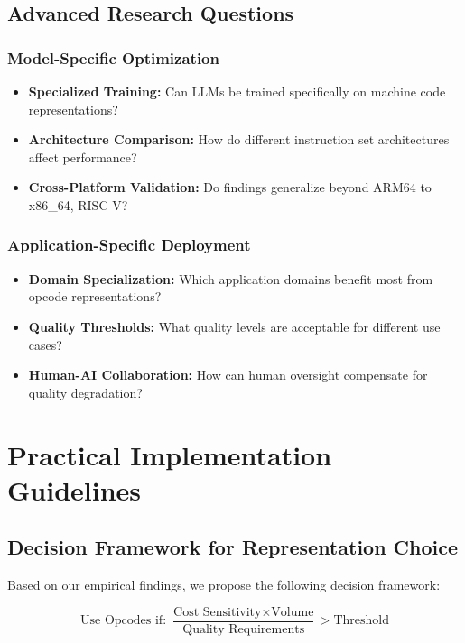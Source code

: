 \documentclass[11pt,a4paper]{article}
\begin{document}
\subsection{Advanced Research Questions}

\subsubsection{Model-Specific Optimization}
\begin{itemize}
    \item \textbf{Specialized Training:} Can LLMs be trained specifically on machine code representations?
    \item \textbf{Architecture Comparison:} How do different instruction set architectures affect performance?
    \item \textbf{Cross-Platform Validation:} Do findings generalize beyond ARM64 to x86\_64, RISC-V?
\end{itemize}

\subsubsection{Application-Specific Deployment}
\begin{itemize}
    \item \textbf{Domain Specialization:} Which application domains benefit most from opcode representations?
    \item \textbf{Quality Thresholds:} What quality levels are acceptable for different use cases?
    \item \textbf{Human-AI Collaboration:} How can human oversight compensate for quality degradation?
\end{itemize}

\section{Practical Implementation Guidelines}

\subsection{Decision Framework for Representation Choice}

Based on our empirical findings, we propose the following decision framework:

\begin{equation}
\text{Use Opcodes if: } \frac{\text{Cost Sensitivity} \times \text{Volume}}{\text{Quality Requirements}} > \text{Threshold}
\end{equation}
\end{document}
